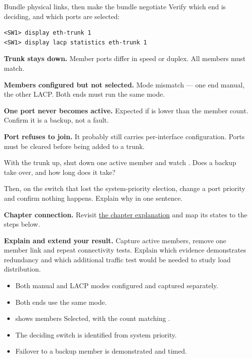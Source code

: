\begin{labproject}{Bundle physical links, then make the bundle negotiate}
Verify which end is deciding, and which ports are selected:

\begin{lstlisting}[style=utpterminal]
<SW1> display eth-trunk 1
<SW1> display lacp statistics eth-trunk 1
\end{lstlisting}

\begin{troubleshoot}
\textbf{Trunk stays down.} Member ports differ in speed or duplex. All members must match.

\textbf{Members configured but not selected.} Mode mismatch --- one end manual, the other LACP. Both ends must run the same mode.

\textbf{One port never becomes active.} Expected if  is lower than the member count. Confirm it is a backup, not a fault.

\textbf{Port refuses to join.} It probably still carries per-interface configuration. Ports must be cleared before being added to a trunk.
\end{troubleshoot}

\begin{tryit}
With the trunk up, shut down one active member and watch . Does a backup take over, and how long does it take?

Then, on the switch that lost the system-priority election, change a port priority and confirm nothing happens. Explain why in one sentence.
\end{tryit}
\end{labproject}

\textbf{Chapter connection.} Revisit \hyperref[ch:lacp]{the chapter explanation} and map its states to the steps below.


\begin{verification}
\textbf{Explain and extend your result.} Capture active members, remove one member link and repeat connectivity tests. Explain which evidence demonstrates redundancy and which additional traffic test would be needed to study load distribution.


\begin{itemize}
  \item Both manual and LACP modes configured and captured separately.
  \item Both ends use the same mode.
  \item {} shows members Selected, with the count matching .
  \item The deciding switch is identified from system priority.
  \item Failover to a backup member is demonstrated and timed.
\end{itemize}
\end{verification}
